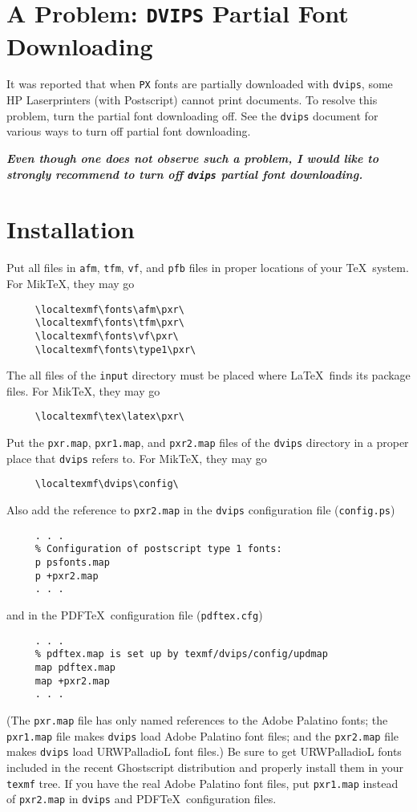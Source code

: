 \documentclass[10pt]{article}
\begin{document}
\section{A Problem: \texttt{DVIPS} Partial Font Downloading}

It was reported that when \texttt{PX} fonts
are partially downloaded with \texttt{dvips},
some HP Laserprinters (with Postscript) cannot
print documents. To resolve this problem,
turn the partial font downloading off.
See the \texttt{dvips} document for various ways to
turn off partial font downloading.

\textbf{\itshape Even though one does not observe such a problem,
I would like to strongly recommend to turn off \texttt{dvips}
partial font downloading.}

\section{Installation}

Put all files in \texttt{afm}, \texttt{tfm}, \texttt{vf},
and \texttt{pfb} files in proper locations of your \TeX\ system.
For Mik\TeX, they may go
\begin{verbatim}
     \localtexmf\fonts\afm\pxr\
     \localtexmf\fonts\tfm\pxr\
     \localtexmf\fonts\vf\pxr\
     \localtexmf\fonts\type1\pxr\
\end{verbatim}
The all files of the \texttt{input} directory must
be placed where \LaTeX\ finds its package files.
For Mik\TeX, they may go
\begin{verbatim}
     \localtexmf\tex\latex\pxr\
\end{verbatim}
Put the \texttt{pxr.map}, \texttt{pxr1.map}, and \texttt{pxr2.map} %
files of the \texttt{dvips}
directory in a proper place that \texttt{dvips} refers to.
For Mik\TeX, they may go
\begin{verbatim}
     \localtexmf\dvips\config\
\end{verbatim}
Also add the reference to \texttt{pxr2.map} in
the \texttt{dvips} configuration file (\texttt{config.ps})
\begin{verbatim}
     . . .
     % Configuration of postscript type 1 fonts:
     p psfonts.map
     p +pxr2.map
     . . .
\end{verbatim}
and in the PDF\TeX\ configuration file (\texttt{pdftex.cfg})
\begin{verbatim}
     . . .
     % pdftex.map is set up by texmf/dvips/config/updmap
     map pdftex.map
     map +pxr2.map
     . . .
\end{verbatim}
(The \texttt{pxr.map} file has only named references to the Adobe Palatino fonts;
the \texttt{pxr1.map} file makes \texttt{dvips} load Adobe Palatino font files;
and the \texttt{pxr2.map}  file makes \texttt{dvips} load URWPalladioL font files.)
Be sure to get URWPalladioL fonts included in the recent Ghostscript
distribution and properly install them in your \texttt{texmf} tree.
If you have the real Adobe Palatino font files, put
\texttt{pxr1.map} instead of \texttt{pxr2.map} in
\texttt{dvips} and PDF\TeX\ configuration files.
\end{document}
